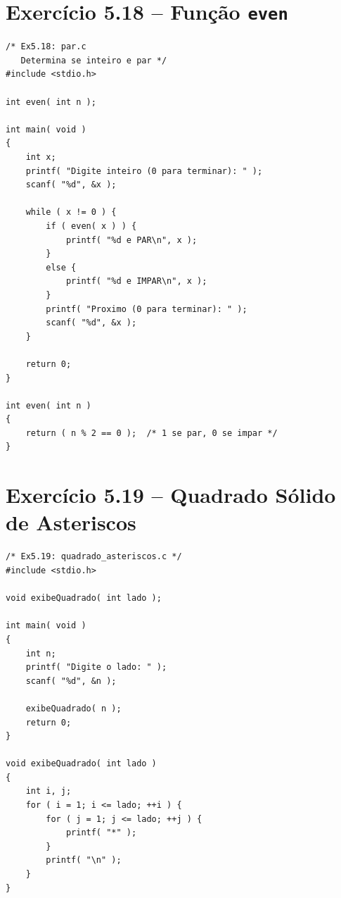 \documentclass[12pt,a4paper]{article}
\begin{document}
\section{Exercício 5.18 -- Função \texttt{even}}

\begin{respostabox}
\begin{lstlisting}
/* Ex5.18: par.c
   Determina se inteiro e par */
#include <stdio.h>

int even( int n );

int main( void )
{
    int x;
    printf( "Digite inteiro (0 para terminar): " );
    scanf( "%d", &x );

    while ( x != 0 ) {
        if ( even( x ) ) {
            printf( "%d e PAR\n", x );
        }
        else {
            printf( "%d e IMPAR\n", x );
        }
        printf( "Proximo (0 para terminar): " );
        scanf( "%d", &x );
    }

    return 0;
}

int even( int n )
{
    return ( n % 2 == 0 );  /* 1 se par, 0 se impar */
}
\end{lstlisting}
\end{respostabox}

\section{Exercício 5.19 -- Quadrado Sólido de Asteriscos}

\begin{respostabox}
\begin{lstlisting}
/* Ex5.19: quadrado_asteriscos.c */
#include <stdio.h>

void exibeQuadrado( int lado );

int main( void )
{
    int n;
    printf( "Digite o lado: " );
    scanf( "%d", &n );

    exibeQuadrado( n );
    return 0;
}

void exibeQuadrado( int lado )
{
    int i, j;
    for ( i = 1; i <= lado; ++i ) {
        for ( j = 1; j <= lado; ++j ) {
            printf( "*" );
        }
        printf( "\n" );
    }
}
\end{lstlisting}
\end{respostabox}
\end{document}
